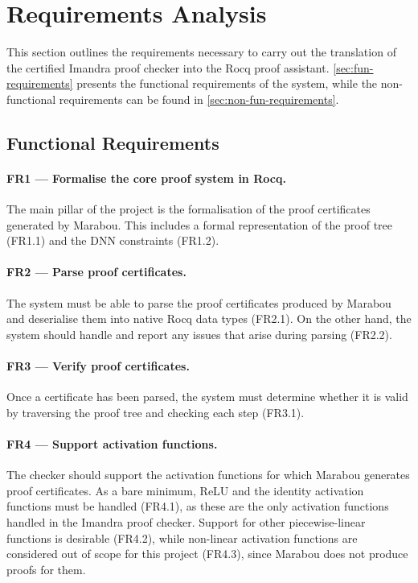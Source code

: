 \section{Requirements Analysis} \label{sec:requirement_analysis}

This section outlines the requirements necessary to carry out the translation of the certified Imandra proof checker into the Rocq proof assistant. \autoref{sec:fun-requirements} presents the functional requirements of the system, while the non-functional requirements can be found in \autoref{sec:non-fun-requirements}.

\subsection{Functional Requirements} \label{sec:fun-requirements}

\paragraph*{FR1 --- Formalise the core proof system in Rocq.} The main pillar of the project is the formalisation of the proof certificates generated by Marabou. This includes a formal representation of the proof tree (FR1.1) and the DNN constraints (FR1.2).

\paragraph*{FR2 --- Parse proof certificates.} The system must be able to parse the proof certificates produced by Marabou and deserialise them into native Rocq data types (FR2.1). On the other hand, the system should handle and report any issues that arise during parsing (FR2.2).

\paragraph*{FR3 --- Verify proof certificates.} Once a certificate has been parsed, the system must determine whether it is valid by traversing the proof tree and checking each step (FR3.1).

\paragraph*{FR4 --- Support activation functions.} The checker should support the activation functions for which Marabou generates proof certificates. As a bare minimum, ReLU and the identity activation functions must be handled (FR4.1), as these are the only activation functions handled in the Imandra proof checker. Support for other piecewise-linear functions is desirable (FR4.2), while non-linear activation functions are considered out of scope for this project (FR4.3), since Marabou does not produce proofs for them.

